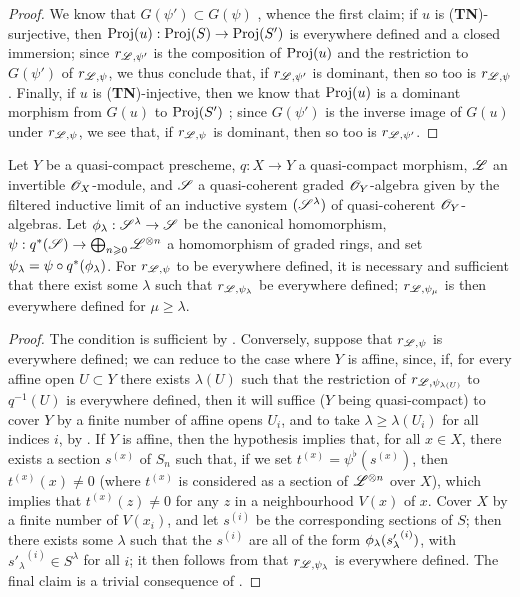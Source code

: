 \begin{proof}
We know that $G(\psi')\subset G(\psi)$ , whence the first claim;
if $u$ is (\textbf{TN})-surjective, then $\Proj(u):\Proj(S)\to\Proj(S')$ is everywhere defined and a closed immersion;
since $r_{\mathscr{L},\psi'}$ is the composition of $\operatorname{Proj}(u)$ and the restriction to $G(\psi')$ of $r_{\mathscr{L},\psi}$, we thus conclude that, if $r_{\mathscr{L},\psi'}$ is dominant, then so too is $r_{\mathscr{L},\psi}$.
Finally, if $u$ is (\textbf{TN})-injective, then we know that $\operatorname{Proj}(u)$ is a dominant morphism from $G(u)$ to $\operatorname{Proj}(S')$ ;
since $G(\psi')$ is the inverse image of $G(u)$ under $r_{\mathscr{L},\psi}$, we see that, if $r_{\mathscr{L},\psi}$ is dominant, then so too is $r_{\mathscr{L},\psi'}$.
\end{proof}

\begin{proposition}[3.7.7]
\label{II.3.7.7}
Let $Y$ be a quasi-compact prescheme, $q:X\to Y$ a quasi-compact morphism, $\mathscr{L}$ an invertible $\mathscr{O}_X$-module, and $\mathscr{S}$ a quasi-coherent graded $\mathscr{O}_Y$-algebra given by the filtered inductive limit of an inductive system $(\mathscr{S}^\lambda)$ of quasi-coherent $\mathscr{O}_Y$-algebras.
Let $\vphi_\lambda:\sh{S}^\lambda\to\sh{S}$ be the canonical homomorphism, $\psi:q^*(\sh{S})\to\bigoplus_{n\geq0}\sh{L}^{\otimes n}$ a homomorphism of graded rings, and set $\psi_\lambda=\psi\circ q^*(\phi_\lambda)$.
For $r_{\mathscr{L},\psi}$ to be everywhere defined, it is necessary and sufficient that there exist some $\lambda$ such that $r_{\mathscr{L},\psi_\lambda}$ be everywhere defined;
$r_{\mathscr{L},\psi_\mu}$ is then everywhere defined for $\mu\geq\lambda$.
\end{proposition}

\begin{proof}
The condition is sufficient by .
Conversely, suppose that $r_{\mathscr{L},\psi}$ is everywhere defined;
we can reduce to the case where $Y$ is affine, since, if, for every affine open $U\subset Y$ there exists $\lambda(U)$ such that the restriction of $r_{\mathscr{L},\psi_{\lambda(U)}}$ to $q^{-1}(U)$ is everywhere defined, then it will suffice ($Y$ being quasi-compact) to cover $Y$ by a finite number of affine opens $U_i$, and to take $\lambda\geq\lambda(U_i)$ for all indices $i$, by .
If $Y$ is affine, then the hypothesis implies that, for all $x\in X$, there exists a section $s^{(x)}$ of $S_n$ such that, if we set $t^{(x)}=\psi^\flat(s^{(x)})$, then $t^{(x)}(x)\neq0$ (where $t^{(x)}$ is considered as a section of $\mathscr{L}^{\otimes n}$ over $X$), which implies that $t^{(x)}(z)\neq0$ for any $z$ in a neighbourhood $V(x)$ of $x$.
Cover $X$ by a finite number of $V(x_i)$, and let $s^{(i)}$ be the corresponding sections of $S$;
then there exists some $\lambda$ such that the $s^{(i)}$ are all of the form $\phi_\lambda({s'_\lambda}^{(i)})$, with ${s'_\lambda}^{(i)}\in S^\lambda$ for all $i$;
it then follows from  that $r_{\mathscr{L},\psi_\lambda}$ is everywhere defined.
The final claim is a trivial consequence of .
\end{proof}

